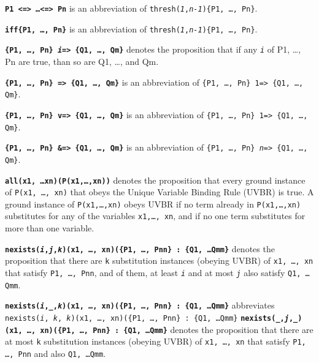 \documentclass{book}
\begin{document}
\textbf{\texttt{P1 <=> \ldots <=> Pn}} is an abbreviation of
\texttt{thresh(\textit{1},\textit{n-1})\{P1, \ldots, Pn\}}.

\textbf{\texttt{iff\{P1, \ldots, Pn\}}} is an abbreviation of
\texttt{thresh(\textit{1},\textit{n-1})\{P1, \ldots, Pn\}}.

\textbf{\texttt{\{P1, \ldots, Pn\} \textit{i}=> \{Q1, \ldots, Qm\}}}
denotes the proposition that if any \texttt{\textit{i}} of
P1, \ldots, Pn are true, than so are Q1, \ldots, and Qm.

\textbf{\texttt{\{P1, \ldots, Pn\} => \{Q1, \ldots, Qm\}}}
is an abbreviation of
\texttt{\{P1, \ldots, Pn\} 1=> \{Q1, \ldots, Qm\}}.

\textbf{\texttt{\{P1, \ldots, Pn\} v=> \{Q1, \ldots, Qm\}}}
is an abbreviation of
\texttt{\{P1, \ldots, Pn\} 1=> \{Q1, \ldots, Qm\}}.

\textbf{\texttt{\{P1, \ldots, Pn\} \&=> \{Q1, \ldots, Qm\}}}
is an abbreviation of
\texttt{\{P1, \ldots, Pn\} \textit{n}=> \{Q1, \ldots, Qm\}}.

\textbf{\texttt{all(x1, \ldots xn)(P(x1,\ldots,xn))}} denotes the
proposition that every ground instance of \texttt{P(x1, \ldots, xn)}
that obeys the Unique Variable Binding Rule (UVBR) is true.  A ground instance of
\texttt{P(x1,\ldots,xn)} obeys UVBR if no term already in
\texttt{P(x1,\ldots,xn)} substitutes for any of the variables
\texttt{x1,\ldots, xn}, and if no one term substitutes for more than
one variable.

\textbf{\texttt{nexists(\textit{i},\textit{j},\textit{k})(x1, \ldots,
    xn)(\{P1, \ldots, Pnn\} : \{Q1, \ldots Qmm\}}} denotes the
proposition that there are \texttt{k} substitution instances (obeying
UVBR) of \texttt{x1, \ldots, xn} that satisfy \texttt{P1, \ldots, Pnn},
and of them, at least \texttt{\textit{i}} and at most
\texttt{\textit{j}} also satisfy \texttt{Q1, \ldots Qmm}.

\textbf{\texttt{nexists(\textit{i},\_,\textit{k})(x1, \ldots,
    xn)(\{P1, \ldots, Pnn\} : \{Q1, \ldots Qmm\}}}
abbreviates\\
\texttt{nexists(\textit{i}, \textit{k}, \textit{k})(x1, \ldots,
    xn)(\{P1, \ldots, Pnn\} : \{Q1, \ldots Qmm\}}
  \textbf{\texttt{nexists(\_,\textit{j},\_)(x1, \ldots, xn)(\{P1,
      \ldots, Pnn\} : \{Q1, \ldots Qmm\}}} denotes the proposition
  that there are at most \texttt{k} substitution instances (obeying
  UVBR) of \texttt{x1, \ldots, xn} that satisfy \texttt{P1, \ldots,
    Pnn} and also \texttt{Q1, \ldots Qmm}.
\end{document}
